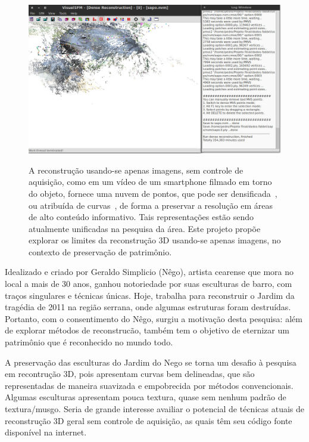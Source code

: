 \begin{figure} [!h]
	\centering
	\includegraphics[width=1\linewidth]{figs/rec3d.jpg}
	\label{fig:rec3d}
	\caption{A reconstrução usando-se apenas imagens, sem controle de aquisição, 
	   como em um vídeo de um smartphone filmado em torno do objeto, fornece uma
	   nuvem de pontos, que pode ser
	   densificada~\cite{Noah:Bundler,Noah:Steven:Bundler,Changchang:VisualSFM,Furukawa:Ponce:CVPR2007,Goesele:MVE:2014}, ou
	   atribuída de
	   curvas~\cite{Usumezbas:Fabbri:Kimia:ECCV16,Fabbri:Kimia:IJCV2016,Fabbri:Kimia:CVPR10,Fabbri:Giblin:Kimia:ECCV12}, de forma a preservar a resolução
	   em áreas de alto conteúdo informativo. Tais representações estão sendo
	   atualmente unificadas na pesquisa da área. Este projeto propõe explorar os
	   limites da reconstrução 3D usando-se apenas imagens, no contexto de
	   preservação de patrimônio.}
\end{figure}


Idealizado e criado por Geraldo Simplicio (Nêgo), artista cearense que mora no 
local a mais de 30 anos, ganhou notoriedade por suas esculturas de barro, com traços 
singulares e técnicas únicas. Hoje, trabalha para reconstruir o Jardim da tragédia de 
2011 na região serrana, onde algumas estruturas foram destruídas. Portanto, com o 
consentimento do Nêgo, surgiu a motivação desta pesquisa: além de explorar métodos de 
reconstrucão, também tem o objetivo de eternizar um patrimônio que é reconhecido no mundo
todo.

A preservação das esculturas do Jardim do Nego se torna um desafio à pesquisa em
recontrução 3D, pois apresentam curvas bem delineadas, que são 
representadas de maneira suavizada e empobrecida por métodos convencionais.
Algumas esculturas apresentam pouca textura, quase sem nenhum padrão de textura/musgo.
Seria de grande interesse availiar o potencial de técnicas atuais de
reconstrução 3D geral sem controle de aquisição, as quais têm seu código fonte
disponível na internet.




